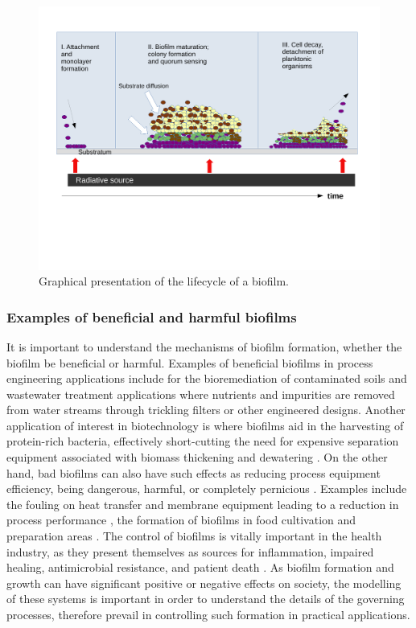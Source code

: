 \begin{figure}[H]
    \centering
    \includegraphics[width=\textwidth]{Chap4/results/biofilm_process.pdf}
    \caption{Graphical presentation of the lifecycle of a biofilm.} 
    \label{fig:biofilm_processes}
\end{figure}


\subsubsection{Examples of beneficial and harmful biofilms}
It is important to understand the mechanisms of biofilm formation, whether the biofilm be beneficial or harmful. Examples of beneficial biofilms in process engineering applications include for the bioremediation of contaminated soils \cite{singh2006} and wastewater treatment applications where nutrients and impurities are removed from water streams through trickling filters or other engineered designs. Another application of interest in biotechnology is where biofilms aid in the harvesting of protein-rich bacteria, effectively short-cutting the need for expensive separation equipment associated with biomass thickening and dewatering \cite{hulsen2016a}.
\skippingparagraph
On the other hand, bad biofilms can also have such effects as reducing process equipment efficiency, being dangerous, harmful, or completely pernicious \cite{donlan2002}. Examples include the fouling on heat transfer and membrane equipment leading to a reduction in process performance \cite{mcdonogh1994}, the formation of biofilms in food cultivation and preparation areas \cite{wirtanen2003}. The control of biofilms is vitally important in the health industry, as they present themselves as sources for inflammation, impaired healing, antimicrobial resistance, and patient death \cite{bryers2008}. As biofilm formation and growth can have significant positive or negative effects on society, the modelling of these systems is important in order to understand the details of the governing processes, therefore prevail in controlling such formation in practical applications. 


